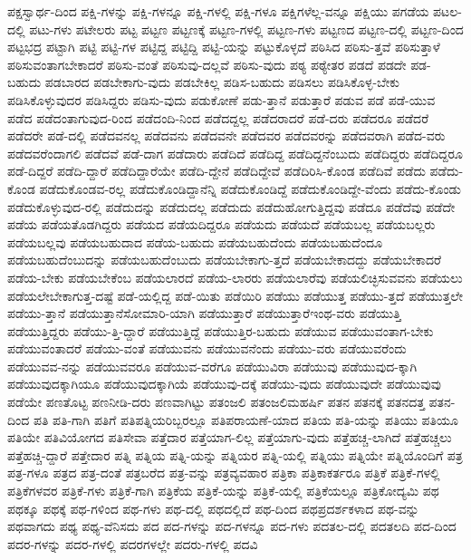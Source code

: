 {ಪಕ್ಷಸ್ವಾರ್ಥ-ದಿಂದ
ಪಕ್ಷಿ-ಗಳನ್ನು
ಪಕ್ಷಿ-ಗಳನ್ನೂ
ಪಕ್ಷಿ-ಗಳಲ್ಲಿ
ಪಕ್ಷಿ-ಗಳೂ
ಪಕ್ಷಿಗಳೆಲ್ಲ-ವನ್ನೂ
ಪಕ್ಷಿಯು
ಪಗಡೆಯ
ಪಟಲ-ದಲ್ಲಿ
ಪಟು-ಗಳು
ಪಟೇಲರು
ಪಟ್ಟ
ಪಟ್ಟಣ
ಪಟ್ಟಣಕ್ಕೆ
ಪಟ್ಟಣ-ಗಳಲ್ಲಿ
ಪಟ್ಟಣ-ಗಳು
ಪಟ್ಟಣದ
ಪಟ್ಟಣ-ದಲ್ಲಿ
ಪಟ್ಟಣ-ದಿಂದ
ಪಟ್ಟಭದ್ರ
ಪಟ್ಟಾಗಿ
ಪಟ್ಟಿ
ಪಟ್ಟಿ-ಗಳ
ಪಟ್ಟಿದ್ದ
ಪಟ್ಟಿದ್ದಿ
ಪಟ್ಟಿ-ಯನ್ನು
ಪಟ್ಟುಕೊಳ್ಳದೆ
ಪಠಿಸಿದ
ಪಠಿಸು-ತ್ತವೆ
ಪಠಿಸುತ್ತಾಳೆ
ಪಠಿಸುವಂತಾಗಬೇಕಾದರೆ
ಪಠಿಸು-ವಂತೆ
ಪಠಿಸುವು-ದಲ್ಲವೆ
ಪಠಿಸು-ವುದು
ಪಠ್ಯ
ಪಠ್ಯೇತರ
ಪಡದೆ
ಪಡದೇ
ಪಡ-ಬಹುದು
ಪಡಬಾರದ
ಪಡಬೇಕಾಗು-ವುದು
ಪಡಬೇಕಿಲ್ಲ
ಪಡಿಸ-ಬಹುದು
ಪಡಿಸಲು
ಪಡಿಸಿಕೊಳ್ಳ-ಬೇಕು
ಪಡಿಸಿಕೊಳ್ಳುವುದರ
ಪಡಿಸಿದ್ದರು
ಪಡಿಸು-ವುದು
ಪಡುಕೋಣೆ
ಪಡು-ತ್ತಾನೆ
ಪಡುತ್ತಾರೆ
ಪಡುವ
ಪಡೆ
ಪಡೆ-ಯುವ
ಪಡೆದ
ಪಡೆದಂತಾಗುವುದ-ರಿಂದ
ಪಡೆದಂದಿ-ನಿಂದ
ಪಡೆದದ್ದಲ್ಲ
ಪಡೆದರಾದರೆ
ಪಡೆ-ದರು
ಪಡೆದರೂ
ಪಡೆದರೆ
ಪಡೆದರೇ
ಪಡೆ-ದಲ್ಲಿ
ಪಡೆದವನಲ್ಲ
ಪಡೆದವನು
ಪಡೆದವನೇ
ಪಡೆದವರ
ಪಡೆದವರನ್ನು
ಪಡೆದವರಾಗಿ
ಪಡೆದ-ವರು
ಪಡೆದವರೆಂದಾಗಲಿ
ಪಡೆದವೆ
ಪಡೆ-ದಾಗ
ಪಡೆದಾರು
ಪಡೆದಿದೆ
ಪಡೆದಿದ್ದ
ಪಡೆದಿದ್ದನೆಂಬುದು
ಪಡೆದಿದ್ದರು
ಪಡೆದಿದ್ದರೂ
ಪಡೆ-ದಿದ್ದರೆ
ಪಡೆದಿ-ದ್ದಾರೆ
ಪಡೆದಿದ್ದಾರೆಯೇ
ಪಡೆದಿ-ದ್ದೇನೆ
ಪಡೆದಿದ್ದೇವೆ
ಪಡೆದಿರಿಸಿ-ಕೊಂಡ
ಪಡೆದಿವೆ
ಪಡೆದು
ಪಡೆದು-ಕೊಂಡ
ಪಡೆದುಕೊಂಡವ-ರಲ್ಲ
ಪಡೆದುಕೊಂಡಿದ್ದಾನೆನ್ನಿ
ಪಡೆದುಕೊಂಡಿದ್ದೆ
ಪಡೆದುಕೊಂಡಿದ್ದೇ-ವೆಂದು
ಪಡೆದು-ಕೊಂಡು
ಪಡೆದುಕೊಳ್ಳುವುದ-ರಲ್ಲಿ
ಪಡೆದುದನ್ನು
ಪಡೆದುದಲ್ಲ
ಪಡೆದುದು
ಪಡೆದುಹೋಗುತ್ತಿದ್ದವು
ಪಡೆದೂ
ಪಡೆದೆವು
ಪಡೆದೇ
ಪಡೆಯ
ಪಡೆಯತೊಡಗಿದ್ದರು
ಪಡೆಯದ
ಪಡೆಯದಿದ್ದರೂ
ಪಡೆಯದು
ಪಡೆಯದೆ
ಪಡೆಯಬಲ್ಲ
ಪಡೆಯಬಲ್ಲರು
ಪಡೆಯಬಲ್ಲವು
ಪಡೆಯಬಹುದಾದ
ಪಡೆಯ-ಬಹುದು
ಪಡೆಯಬಹುದೆಂದು
ಪಡೆಯಬಹುದೆಂದೂ
ಪಡೆಯಬಹುದೆಂಬುದನ್ನು
ಪಡೆಯಬಹುದೆಂಬುದು
ಪಡೆಯಬೇಕಾಗು-ತ್ತದೆ
ಪಡೆಯಬೇಕಾದದ್ದು
ಪಡೆಯಬೇಕಾದರೆ
ಪಡೆಯ-ಬೇಕು
ಪಡೆಯಬೇಕೆಂಬ
ಪಡೆಯಲಾರದೆ
ಪಡೆಯ-ಲಾರರು
ಪಡೆಯಲಾರೆವು
ಪಡೆಯಲಿಚ್ಛಿಸುವವನು
ಪಡೆಯಲು
ಪಡೆಯಲೇಬೇಕಾಗುತ್ತ-ದಷ್ಟೆ
ಪಡೆ-ಯಲ್ಲಿದ್ದ
ಪಡೆ-ಯಿತು
ಪಡೆಯಿರಿ
ಪಡೆಯು
ಪಡೆಯುತ್ತ
ಪಡೆಯು-ತ್ತದೆ
ಪಡೆಯುತ್ತಲೇ
ಪಡೆಯು-ತ್ತಾನೆ
ಪಡೆಯುತ್ತಾನೆಸೋಮಾರಿ-ಯಾಗಿ
ಪಡೆಯುತ್ತಾರೆ
ಪಡೆಯುತ್ತಾರೆಇಂಥ-ವರು
ಪಡೆಯುತ್ತಿ
ಪಡೆಯುತ್ತಿದ್ದರು
ಪಡೆಯು-ತ್ತಿ-ದ್ದಾರೆ
ಪಡೆಯುತ್ತಿದ್ದೆ
ಪಡೆಯುತ್ತಿರ-ಬಹುದು
ಪಡೆಯುವ
ಪಡೆಯುವಂತಾಗ-ಬೇಕು
ಪಡೆಯುವಂತಾದರೆ
ಪಡೆಯು-ವಂತೆ
ಪಡೆಯುವನು
ಪಡೆಯುವನೆಂದು
ಪಡೆಯು-ವರು
ಪಡೆಯುವರೆಂದು
ಪಡೆಯುವವ-ನನ್ನು
ಪಡೆಯುವವರೂ
ಪಡೆಯುವ-ವರೆಗೂ
ಪಡೆಯುವಿರಾ
ಪಡೆಯುವು
ಪಡೆಯುವುದ-ಕ್ಕಾಗಿ
ಪಡೆಯುವುದಕ್ಕಾಗಿಯೂ
ಪಡೆಯುವುದಕ್ಕಾಗಿಯೆ
ಪಡೆಯುವು-ದಕ್ಕೆ
ಪಡೆಯು-ವುದು
ಪಡೆಯುವುದೇ
ಪಡೆಯುವುವು
ಪಡೆಯೇ
ಪಣತೊಟ್ಟ
ಪಣನೀಡಿ-ದರು
ಪಣವಾಗಿಟ್ಟು
ಪತಂಜಲಿ
ಪತಂಜಲಿಮಹರ್ಷಿ
ಪತನ
ಪತನಕ್ಕೆ
ಪತನದತ್ತ
ಪತನ-ದಿಂದ
ಪತಿ
ಪತಿ-ಗಾಗಿ
ಪತಿಗೆ
ಪತಿಪತ್ನಿಯರಿಬ್ಬರಲ್ಲೂ
ಪತಿಪರಾಯಣೆ-ಯಾದ
ಪತಿಯ
ಪತಿ-ಯನ್ನು
ಪತಿಯು
ಪತಿಯೂ
ಪತಿಯೇ
ಪತಿವಿಯೋಗದ
ಪತಿಸೇವಾ
ಪತ್ತೆದಾರ
ಪತ್ತೆಯಾಗ-ಲಿಲ್ಲ
ಪತ್ತೆಯಾಗು-ವುದು
ಪತ್ತೆಹಚ್ಚ-ಲಾಗಿದೆ
ಪತ್ತೆಹಚ್ಚಲು
ಪತ್ತೆಹಚ್ಚಿ-ದ್ದಾರೆ
ಪತ್ತೇದಾರ
ಪತ್ನಿ
ಪತ್ನಿಯ
ಪತ್ನಿ-ಯನ್ನು
ಪತ್ನಿಯರ
ಪತ್ನಿ-ಯಲ್ಲಿ
ಪತ್ನಿಯು
ಪತ್ನಿಯೇ
ಪತ್ನಿಯೊಂದಿಗೆ
ಪತ್ರ
ಪತ್ರ-ಗಳೂ
ಪತ್ರದ
ಪತ್ರ-ದಂತೆ
ಪತ್ರಬರೆದ
ಪತ್ರ-ವನ್ನು
ಪತ್ರವ್ಯವಹಾರ
ಪತ್ರಿಕಾ
ಪತ್ರಿಕಾಕರ್ತರೂ
ಪತ್ರಿಕೆ
ಪತ್ರಿಕೆ-ಗಳಲ್ಲಿ
ಪತ್ರಿಕೆಗಳವರ
ಪತ್ರಿಕೆ-ಗಳು
ಪತ್ರಿಕೆ-ಗಾಗಿ
ಪತ್ರಿಕೆಯ
ಪತ್ರಿಕೆ-ಯನ್ನು
ಪತ್ರಿಕೆ-ಯಲ್ಲಿ
ಪತ್ರಿಕೆಯಲ್ಲೂ
ಪತ್ರಿಕೋದ್ಯಮಿ
ಪಥ
ಪಥಕ್ಕೂ
ಪಥಕ್ಕೆ
ಪಥ-ಗಳಿಂದ
ಪಥ-ಗಳು
ಪಥ-ದಲ್ಲಿ
ಪಥದಲ್ಲಿದೆ
ಪಥ-ದಿಂದ
ಪಥಪ್ರದರ್ಶಕಳಾದ
ಪಥ-ವನ್ನು
ಪಥವಾಗದು
ಪಥ್ಯ
ಪಥ್ಯ-ವೆನಿಸದು
ಪದ
ಪದ-ಗಳನ್ನು
ಪದ-ಗಳನ್ನೂ
ಪದ-ಗಳು
ಪದತಲ-ದಲ್ಲಿ
ಪದತಲದಿ
ಪದ-ದಿಂದ
ಪದರ-ಗಳನ್ನು
ಪದರ-ಗಳಲ್ಲಿ
ಪದರಗಳಲ್ಲೇ
ಪದರು-ಗಳಲ್ಲಿ
ಪದವಿ
}
